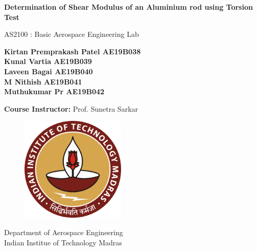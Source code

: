 \documentclass[12pt,a4paper]{article}
\begin{document}
\begin{titlepage}
   \begin{center}
       \vspace*{1cm}

		\Huge
       \textbf{Determination of Shear Modulus of an Aluminium rod using Torsion Test}

       \vspace{0.5cm}
        AS2100 : Basic Aerospace Engineering Lab
            
       \vspace{1.5cm}

       \textbf{Kirtan Premprakash Patel	AE19B038}\\
		\textbf{Kunal Vartia	AE19B039}\\
		\textbf{Laveen Bagai	AE19B040}\\
		\textbf{M Nithish	AE19B041}\\
		\textbf{Muthukumar Pr	AE19B042}
       \vfill
            
       \vspace{2.5cm}     
       \textbf{Course Instructor:}
       Prof. Sunetra Sarkar
            
       \vspace{0.5cm}
           
	   	\begin{figure}[h!]
	   	\centering

	   		\includegraphics[width=5cm]{Logo.png}

	   \end{figure}
         \vspace{0.5cm}
            Department of Aerospace Engineering\\
            Indian Institue of Technology Madras\\
   \end{center}
\end{titlepage}
\end{document}
